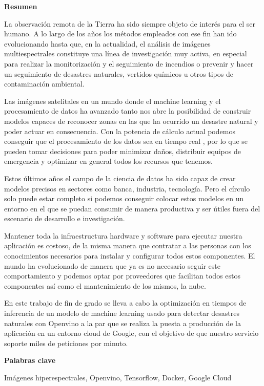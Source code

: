 \cleardoublepage
\begin{center}

{\bf \Huge Resumen}

\end{center}

La observación remota de la Tierra ha sido siempre objeto de interés para el ser humano.
A lo largo de los años los métodos empleados con ese fin han ido evolucionando hasta que, en la actualidad, el análisis de imágenes multiespectrales constituye una línea de
investigación muy activa, en especial para realizar la monitorización y el seguimiento de incendios o prevenir y hacer un seguimiento de desastres naturales, vertidos químicos
u otros tipos de contaminación ambiental.

Las imágenes satelitales en un mundo donde el machine learning y el procesamiento de datos ha avanzado tanto nos abre la posibilidad de construir modelos capaces de reconocer zonas
en las que ha ocurrido un desastre natural y poder actuar en consecuencia.
Con la potencia de cálculo actual podemos conseguir que el procesamiento de los datos sea en tiempo real , por lo que se pueden tomar decisiones para poder minimizar daños, distribuir
equipos de emergencia y optimizar en general todos los recursos que tenemos.

Estos últimos años el campo de la ciencia de datos ha sido capaz de crear modelos precisos en sectores como banca, industria, tecnología.
Pero el círculo solo puede estar completo si podemos
conseguir colocar estos modelos en un entorno en el que se puedan consumir de manera productiva y ser útiles fuera del escenario de desarrollo e investigación.

Mantener toda la infraestructura hardware y software para ejecutar nuestra aplicación es costoso, de la misma manera que contratar a las personas con los conocimientos necesarios
para instalar y configurar todos estos componentes.
El mundo ha evolucionado de manera que ya es no necesario seguir este comportamiento y podemos optar por proveedores que facilitan todos estos componentes
así como el mantenimiento de los mismos, la nube.

En este trabajo de fin de grado se lleva a cabo la optimización en tiempos de inferencia de un modelo de machine learning usado para detectar desastres naturales con Openvino a la par que se realiza la puesta a
producción de la aplicación en un entorno cloud de Google, con el objetivo de que nuestro servicio soporte miles de peticiones por minuto.

\vspace{0.8cm}
\begin{center}


{\bf \Large Palabras clave}

\end{center}

Imágenes hiperespectrales, Openvino, Tensorflow, Docker, Google Cloud

\vspace{0.3cm}